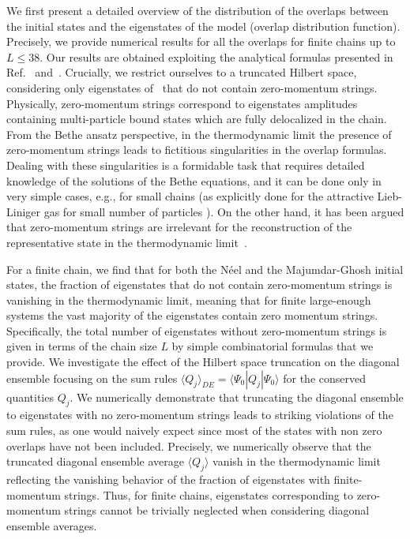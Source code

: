 \documentclass[11pt]{iopart}
\begin{document}
We first present a detailed overview of the distribution of the overlaps between 
the initial states and the eigenstates of the model (overlap distribution function). 
Precisely, we provide numerical results for all the overlaps for finite chains up 
to $L\le 38$. Our results are obtained exploiting the analytical formulas 
presented in Ref.~\cite{brockmann-2014} and~\cite{pozsgay-2014a}. Crucially, 
we restrict ourselves to a truncated Hilbert space, considering only eigenstates 
of~ that do not contain zero-momentum strings. Physically, 
zero-momentum strings correspond to eigenstates amplitudes containing multi-particle  
bound states which are fully delocalized in the chain. From the Bethe ansatz perspective, 
in the thermodynamic limit the presence of zero-momentum strings leads to fictitious 
singularities in the overlap formulas. Dealing with these singularities is 
a formidable task that requires detailed knowledge of the solutions of the 
Bethe equations, and it can be done only in very simple cases, e.g., for small 
chains (as explicitly done for the attractive Lieb-Liniger gas for small number 
of particles \cite{calabrese-2014}). On the other hand, it has been argued that 
zero-momentum strings are irrelevant for the reconstruction of the representative 
state in the thermodynamic limit~\cite{wouters-2014A}. 

For a finite chain, we find that for both the N\'eel and the Majumdar-Ghosh initial states, 
the fraction of eigenstates that do not contain zero-momentum strings 
is vanishing in the thermodynamic limit, meaning that for finite large-enough 
systems the vast majority of the eigenstates contain zero momentum strings. Specifically, 
the total number of eigenstates without zero-momentum strings is given in terms of the 
chain size $L$ by simple combinatorial formulas that we provide. 
%
We investigate the effect of the Hilbert space truncation on the diagonal ensemble focusing on the  
sum rules $\langle Q_j\rangle_{DE}=\langle\Psi_0|Q_j|\Psi_0\rangle$ for the conserved quantities $Q_j$. 
We numerically demonstrate that truncating the diagonal ensemble to 
eigenstates with no zero-momentum strings leads to striking violations of the sum rules,  
as one would naively expect since most of the states with non zero overlaps have not been included. 
Precisely, we numerically observe that the truncated diagonal ensemble 
average $\langle Q_j\rangle$ vanish in the thermodynamic limit reflecting the 
vanishing behavior of the fraction of eigenstates with finite-momentum strings. 
Thus, for finite chains, eigenstates corresponding 
to zero-momentum strings cannot be trivially neglected when considering 
diagonal ensemble averages. 
\end{document}
